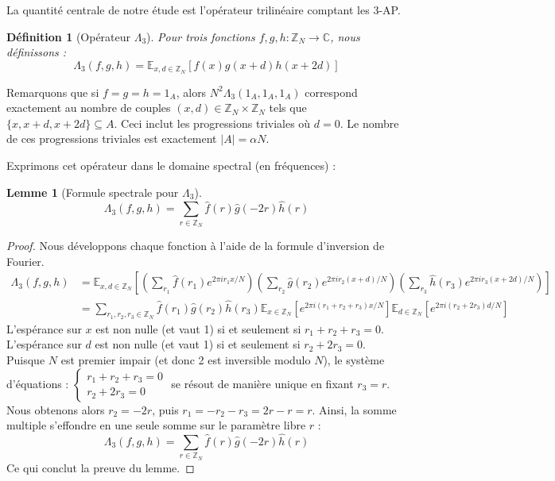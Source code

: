 \documentclass[12pt, a4paper]{article}
\newtheorem{lemma}[theorem]{Lemme}
\newtheorem{definition}[theorem]{Définition}
\begin{document}
La quantité centrale de notre étude est l'opérateur trilinéaire comptant les 3-AP.
\begin{definition}[Opérateur $\Lambda_3$]
Pour trois fonctions $f, g, h : \mathbb{Z}_N \to \mathbb{C}$, nous définissons :
\begin{equation}
\Lambda_3(f, g, h) = \mathbb{E}_{x, d \in \mathbb{Z}_N} [f(x) g(x+d) h(x+2d)]
\end{equation}
\end{definition}
Remarquons que si $f = g = h = 1_A$, alors $N^2 \Lambda_3(1_A, 1_A, 1_A)$ correspond exactement au nombre de couples $(x, d) \in \mathbb{Z}_N \times \mathbb{Z}_N$ tels que $\{x, x+d, x+2d\} \subseteq A$. Ceci inclut les progressions triviales où $d=0$. Le nombre de ces progressions triviales est exactement $|A| = \alpha N$.

Exprimons cet opérateur dans le domaine spectral (en fréquences) :
\begin{lemma}[Formule spectrale pour $\Lambda_3$]
\begin{equation}
\Lambda_3(f, g, h) = \sum_{r \in \mathbb{Z}_N} \widehat{f}(r) \widehat{g}(-2r) \widehat{h}(r)
\end{equation}
\end{lemma}
\begin{proof}
Nous développons chaque fonction à l'aide de la formule d'inversion de Fourier.
\begin{align}
\Lambda_3(f, g, h) &= \mathbb{E}_{x, d \in \mathbb{Z}_N} \left[ \left(\sum_{r_1} \widehat{f}(r_1) e^{2\pi i r_1 x / N}\right) \left(\sum_{r_2} \widehat{g}(r_2) e^{2\pi i r_2 (x+d) / N}\right) \left(\sum_{r_3} \widehat{h}(r_3) e^{2\pi i r_3 (x+2d) / N}\right) \right] \\
&= \sum_{r_1, r_2, r_3 \in \mathbb{Z}_N} \widehat{f}(r_1) \widehat{g}(r_2) \widehat{h}(r_3) \mathbb{E}_{x \in \mathbb{Z}_N} \left[ e^{2\pi i (r_1 + r_2 + r_3) x / N} \right] \mathbb{E}_{d \in \mathbb{Z}_N} \left[ e^{2\pi i (r_2 + 2r_3) d / N} \right]
\end{align}
L'espérance sur $x$ est non nulle (et vaut 1) si et seulement si $r_1 + r_2 + r_3 = 0$.
L'espérance sur $d$ est non nulle (et vaut 1) si et seulement si $r_2 + 2r_3 = 0$.
Puisque $N$ est premier impair (et donc 2 est inversible modulo $N$), le système d'équations :
$\begin{cases}
r_1 + r_2 + r_3 = 0 \\
r_2 + 2r_3 = 0
\end{cases}$
se résout de manière unique en fixant $r_3 = r$. Nous obtenons alors $r_2 = -2r$, puis $r_1 = -r_2 - r_3 = 2r - r = r$.
Ainsi, la somme multiple s'effondre en une seule somme sur le paramètre libre $r$ :
\begin{equation}
\Lambda_3(f, g, h) = \sum_{r \in \mathbb{Z}_N} \widehat{f}(r) \widehat{g}(-2r) \widehat{h}(r)
\end{equation}
Ce qui conclut la preuve du lemme.
\end{proof}
\end{document}
